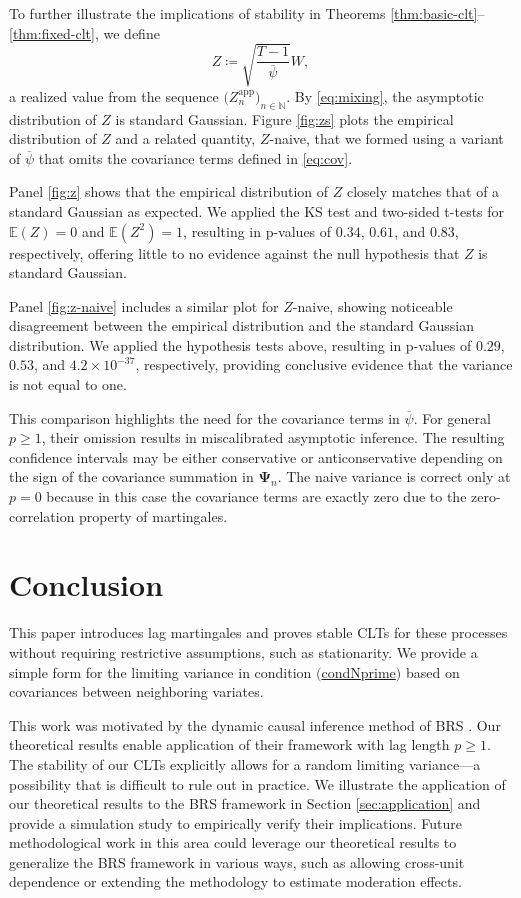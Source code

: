 \documentclass[11pt]{article}
\newcommand\mat[1]{\mathbf{#1}}
\newcommand{\E}{\mathbb{E}}
\newcommand{\N}{\mathbb{N}}
\newcommand{\refitem}[1]{$\mathrm{(}$\hyperlink{cond:#1}{\csname cond#1\endcsname}$\mathrm{)}$}
\theoremstyle{definition}
\begin{document}
To further illustrate the implications of stability in Theorems \ref{thm:basic-clt}--\ref{thm:fixed-clt}, we define
\begin{equation}
\label{eq:sim-Z}
Z \coloneqq \sqrt{\frac{T-1}{\overline{\psi}}} W,
\end{equation}
a realized value from the sequence $\big(Z_n^{\mathrm{app}}\big)_{n \in \N}$.
By \eqref{eq:mixing}, the asymptotic distribution of $Z$ is standard Gaussian.
Figure \ref{fig:zs} plots the empirical distribution of $Z$ and a related quantity, $Z$-naive, that we formed using a variant of $\overline{\psi}$ that omits the covariance terms defined in \eqref{eq:cov}.

Panel \ref{fig:z} shows that the empirical distribution of $Z$ closely matches that of a standard Gaussian as expected.
We applied the KS test and two-sided t-tests for $\E(Z)=0$ and $\E(Z^2)=1$, resulting in p-values of $0.34$, $0.61$, and $0.83$, respectively, offering little to no evidence against the null hypothesis that $Z$ is standard Gaussian.

Panel \ref{fig:z-naive} includes a similar plot for $Z$-naive, showing noticeable disagreement between the empirical distribution and the standard Gaussian distribution.
We applied the hypothesis tests above, resulting in p-values of $0.29$, $0.53$, and $4.2 \times 10^{-37}$, respectively, providing conclusive evidence that the variance is not equal to one.


This comparison highlights the need for the covariance terms in $\overline{\psi}$.
For general $p \geq 1$, their omission results in miscalibrated asymptotic inference.
The resulting confidence intervals may be either conservative or anticonservative depending on the sign of the covariance summation in $\mat{\Psi}_n$.
The naive variance is correct only at $p=0$ because in this case the covariance terms are exactly zero due to the zero-correlation property of martingales.

\section{Conclusion}\label{sec:conclusion}

This paper introduces lag martingales and proves stable CLTs for these processes without requiring restrictive assumptions, such as stationarity.
We provide a simple form for the limiting variance in condition \refitem{Nprime} based on covariances between neighboring variates.

This work was motivated by the dynamic causal inference method of BRS \citep{bojinov_panel_2021,bojinov_time_2019}.
Our theoretical results enable application of their framework with lag length $p \geq 1$.
The stability of our CLTs explicitly allows for a random limiting variance---a possibility that is difficult to rule out in practice.
We illustrate the application of our theoretical results to the BRS framework in Section \ref{sec:application} and provide a simulation study to empirically verify their implications.
Future methodological work in this area could leverage our theoretical results to generalize the BRS framework in various ways, such as allowing cross-unit dependence or extending the methodology to estimate moderation effects.
\end{document}
